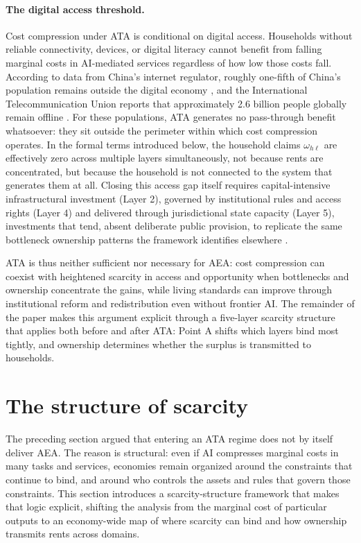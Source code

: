 \documentclass[11pt]{article}
\begin{document}
\paragraph{The digital access threshold.}
Cost compression under ATA is conditional on digital access. Households without reliable connectivity, devices, or digital literacy cannot benefit from falling marginal costs in AI-mediated services regardless of how low those costs fall. According to data from China's internet regulator, roughly one-fifth of China's population remains outside the digital economy \citep{CNNIC2024}, and the International Telecommunication Union reports that approximately 2.6 billion people globally remain offline \citep{ITU2023}. For these populations, ATA generates no pass-through benefit whatsoever: they sit outside the perimeter within which cost compression operates. In the formal terms introduced below, the household claims \(\omega_{h\ell}\) are effectively zero across multiple layers simultaneously, not because rents are concentrated, but because the household is not connected to the system that generates them at all. Closing this access gap itself requires capital-intensive infrastructural investment (Layer 2), governed by institutional rules and access rights (Layer 4) and delivered through jurisdictional state capacity (Layer 5), investments that tend, absent deliberate public provision, to replicate the same bottleneck ownership patterns the framework identifies elsewhere \citep{ITU2023, IMF2024}.

ATA is thus neither sufficient nor necessary for AEA: cost compression can coexist with heightened scarcity in access and opportunity when bottlenecks and ownership concentrate the gains, while living standards can improve through institutional reform and redistribution even without frontier AI. The remainder of the paper makes this argument explicit through a five-layer scarcity structure that applies both before and after ATA: Point A shifts which layers bind most tightly, and ownership determines whether the surplus is transmitted to households.

\section{The structure of scarcity}
\label{sec:framework}

The preceding section argued that entering an ATA regime does not by itself deliver AEA. The reason is structural: even if AI compresses marginal costs in many tasks and services, economies remain organized around the constraints that continue to bind, and around who controls the assets and rules that govern those constraints. This section introduces a scarcity-structure framework that makes that logic explicit, shifting the analysis from the marginal cost of particular outputs to an economy-wide map of where scarcity can bind and how ownership transmits rents across domains.
\end{document}
